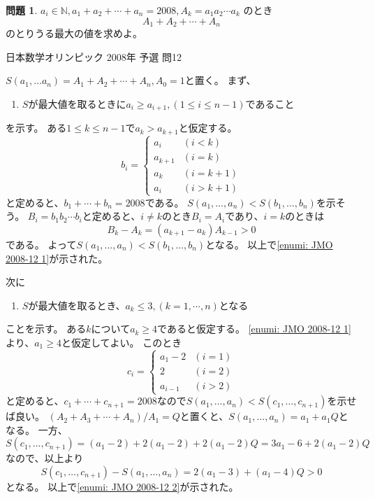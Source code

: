 \documentclass[uplatex, a5paper]{jsarticle}
\makeatletter
\theoremstyle{definition}
\newtheorem{prob}{問題}
\renewenvironment{proof}[1][\proofname]{
  \pushQED{\qed}%
  \normalfont \topsep6\p@\@plus6\p@\relax
  \trivlist
  \item[\hskip\labelsep
    #1\@addpunct{\textbf{.}}]\ignorespaces
}{%
  \popQED\endtrivlist\@endpefalse
}
\providecommand{\proofname}{証明}
\def\qed{\hfill $\Box$}
\makeatother
\begin{document}
\begin{prob}
  \(a_i \in \mathbb{N} , a_1 + a_2 + \cdots + a_n = 2008, A_k = a_1a_2\cdots a_k\)
  のとき
  \[
  A_1 + A_2 + \cdots + A_n
  \]
  のとりうる最大の値を求めよ。
  \begin{flushright}
    日本数学オリンピック 2008年 予選 問12
  \end{flushright}
\end{prob}


\begin{proof}
  \(S(a_1,\ldots a_n ) = A_1 + A_2 + \cdots + A_n , A_0=1\)と置く。
  まず、
  \begin{enumerate}
    \item \label{enumi: JMO 2008-12 1}
    \(S\)が最大値を取るときに\(a_i \geq a_{i+1} , ( 1\leq i \leq n-1 )\)であること
  \end{enumerate}
  を示す。
  ある\(1 \leq k \leq n-1\)で\(a_k > a_{k+1}\)と仮定する。
  \[
  b_i = \begin{cases}
  a_i     & (i<k)      \\
  a_{k+1} & (i=k)      \\
  a_k     & (i=k+1)    \\
  a_i     & ( i> k+1 )
  \end{cases}
  \]
  と定めると、\(b_1+\cdots +b_n=2008\)である。
  \(S(a_1,\ldots ,a_n) < S(b_1,\ldots ,b_n)\)を示そう。
  \(B_i=b_1b_2\cdots b_i\)と定めると、\(i\neq k\)のとき\(B_i=A_i\)であり、\(i=k\)のときは
  \[
  B_k-A_k = (a_{k+1}-a_k)A_{k-1} > 0
  \]
  である。
  よって\(S(a_1,\ldots ,a_n) < S(b_1,\ldots ,b_n)\)となる。
  以上で\ref{enumi: JMO 2008-12 1}が示された。

  次に
  \begin{enumerate}[start=2]
    \item \label{enumi: JMO 2008-12 2}
    \(S\)が最大値を取るとき、\(a_k \leq 3 , (k=1,\cdots ,n)\)となる
  \end{enumerate}
  ことを示す。
  ある\(k\)について\(a_k\geq 4\)であると仮定する。
  \ref{enumi: JMO 2008-12 1}より、\(a_1\geq 4\)と仮定してよい。
  このとき
  \[
  c_i = \begin{cases}
  a_1-2   & (i=1)    \\
  2       & (i=2)    \\
  a_{i-1} & (i>2)
  \end{cases}
  \]
  と定めると、\(c_1+\cdots +c_{n+1} = 2008\)なので\(S(a_1,\ldots ,a_n) < S(c_1,\ldots ,c_{n+1})\)を示せば良い。
  \((A_2+A_3+\cdots + A_n)/A_1=Q\)と置くと、\(S(a_1,\ldots ,a_n) = a_1+a_1Q\)となる。
  一方、\(S(c_1,\ldots ,c_{n+1})=(a_1-2)+2(a_1-2)+2(a_1-2)Q=3a_1-6+2(a_1-2)Q\)なので、以上より
  \[
  S(c_1,\ldots ,c_{n+1}) - S(a_1,\ldots ,a_n) = 2(a_1-3)+(a_1-4)Q > 0
  \]
  となる。
  以上で\ref{enumi: JMO 2008-12 2}が示された。


\end{proof}
\end{document}

